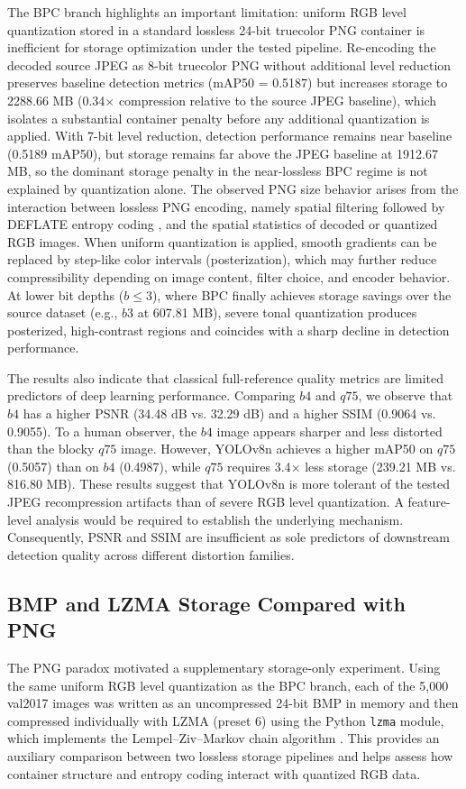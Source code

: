 \documentclass[12pt, a4paper]{article}
\begin{document}
The BPC branch highlights an important limitation: uniform RGB level quantization stored in a standard lossless 24-bit truecolor PNG container is inefficient for storage optimization under the tested pipeline. Re-encoding the decoded source JPEG as 8-bit truecolor PNG without additional level reduction preserves baseline detection metrics (mAP50 = 0.5187) but increases storage to 2288.66 MB (0.34$\times$ compression relative to the source JPEG baseline), which isolates a substantial container penalty before any additional quantization is applied. With 7-bit level reduction, detection performance remains near baseline (0.5189 mAP50), but storage remains far above the JPEG baseline at 1912.67 MB, so the dominant storage penalty in the near-lossless BPC regime is not explained by quantization alone. The observed PNG size behavior arises from the interaction between lossless PNG encoding, namely spatial filtering followed by DEFLATE entropy coding \cite{w3c2003}, and the spatial statistics of decoded or quantized RGB images. When uniform quantization is applied, smooth gradients can be replaced by step-like color intervals (posterization), which may further reduce compressibility depending on image content, filter choice, and encoder behavior. At lower bit depths ($b \le 3$), where BPC finally achieves storage savings over the source dataset (e.g., $b3$ at 607.81 MB), severe tonal quantization produces posterized, high-contrast regions and coincides with a sharp decline in detection performance.

The results also indicate that classical full-reference quality metrics are limited predictors of deep learning performance. Comparing $b4$ and $q75$, we observe that $b4$ has a higher PSNR (34.48 dB vs. 32.29 dB) and a higher SSIM (0.9064 vs. 0.9055). To a human observer, the $b4$ image appears sharper and less distorted than the blocky $q75$ image. However, YOLOv8n achieves a higher mAP50 on $q75$ (0.5057) than on $b4$ (0.4987), while $q75$ requires 3.4$\times$ less storage (239.21 MB vs. 816.80 MB). These results suggest that YOLOv8n is more tolerant of the tested JPEG recompression artifacts than of severe RGB level quantization. A feature-level analysis would be required to establish the underlying mechanism. Consequently, PSNR and SSIM are insufficient as sole predictors of downstream detection quality across different distortion families.

\subsection{BMP and LZMA Storage Compared with PNG}
The PNG paradox motivated a supplementary storage-only experiment. Using the same uniform RGB level quantization as the BPC branch, each of the 5,000 val2017 images was written as an uncompressed 24-bit BMP in memory and then compressed individually with LZMA (preset 6) using the Python \texttt{lzma} module, which implements the Lempel--Ziv--Markov chain algorithm \cite{pavlov2013}. This provides an auxiliary comparison between two lossless storage pipelines and helps assess how container structure and entropy coding interact with quantized RGB data.
\end{document}
